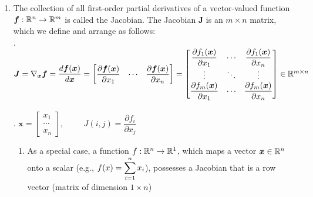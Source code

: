 \begin{enumerate}
    \item
    \begin{definition}[Jacobian ($\bm{J} = \nabla_{\bm{x}}\bm{f} = \dfrac{d \bm{f}(\bm{x})}{d \bm{x}}$)]
        The collection of all first-order partial derivatives of a vector-valued function $\bm{f} : \mathbb{R}^n \to \mathbb{R}^m$ is called the Jacobian.
        The Jacobian $\bm{J}$ is an $m \times n$ matrix, which we define and arrange as follows:
        \hfill \cite{mfml/book/mml/Deisenroth-Faisal-Ong}
        \\
        .\hfill
        $
            \bm{J}
            = \nabla_{\bm{x}}\bm{f}
            = \dfrac{d \bm{f}(\bm{x})}{d \bm{x}}
            = \begin{bmatrix}
                \dfrac{\partial \bm{f}(\bm{x})}{\partial x_1} &
                \cdots &
                \dfrac{\partial \bm{f}(\bm{x})}{\partial x_n}
            \end{bmatrix}
            = \begin{bmatrix}
                \dfrac{\partial f_1(\bm{x})}{\partial x_1} &
                \cdots &
                \dfrac{\partial f_1(\bm{x})}{\partial x_n} \\
                \vdots & \ddots & \vdots \\
                \dfrac{\partial f_m(\bm{x})}{\partial x_1} &
                \cdots &
                \dfrac{\partial f_m(\bm{x})}{\partial x_n} \\
            \end{bmatrix}
            \in \mathbb{R}^{m\times n}
        $
        \hfill \cite{mfml/book/mml/Deisenroth-Faisal-Ong}
        \\
        .\hfill
        $
            \bm{x} = \begin{bmatrix}
                x_1 \\ \cdots \\ x_n
            \end{bmatrix},
            \hspace{1cm}
            J(i,j) = \dfrac{\partial f_i}{\partial x_j}
        $
        \hfill \cite{mfml/book/mml/Deisenroth-Faisal-Ong}
    \end{definition}
    \begin{enumerate}
        \item As a special case, a function $f : \mathbb{R}^n \to \mathbb{R}^1$, which maps a vector $\bm{x} \in \mathbb{R}^n$ onto a scalar (e.g., $f (x) = \displaystyle\sum^n _{i=1} x_i$), possesses a Jacobian that is a row vector (matrix of dimension $1 \times n$)
        \hfill \cite{mfml/book/mml/Deisenroth-Faisal-Ong}


\end{enumerate}
\end{enumerate}
